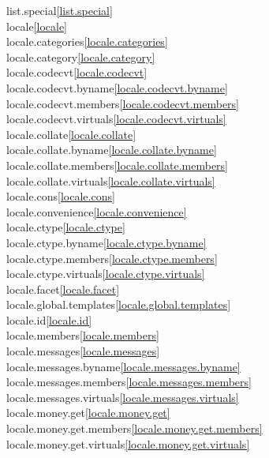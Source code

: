\begin{multicols}{2}
list.special\quad\ref{list.special}\\
locale\quad\ref{locale}\\
locale.categories\quad\ref{locale.categories}\\
locale.category\quad\ref{locale.category}\\
locale.codecvt\quad\ref{locale.codecvt}\\
locale.codecvt.byname\quad\ref{locale.codecvt.byname}\\
locale.codecvt.members\quad\ref{locale.codecvt.members}\\
locale.codecvt.virtuals\quad\ref{locale.codecvt.virtuals}\\
locale.collate\quad\ref{locale.collate}\\
locale.collate.byname\quad\ref{locale.collate.byname}\\
locale.collate.members\quad\ref{locale.collate.members}\\
locale.collate.virtuals\quad\ref{locale.collate.virtuals}\\
locale.cons\quad\ref{locale.cons}\\
locale.convenience\quad\ref{locale.convenience}\\
locale.ctype\quad\ref{locale.ctype}\\
locale.ctype.byname\quad\ref{locale.ctype.byname}\\
locale.ctype.members\quad\ref{locale.ctype.members}\\
locale.ctype.virtuals\quad\ref{locale.ctype.virtuals}\\
locale.facet\quad\ref{locale.facet}\\
locale.global.templates\quad\ref{locale.global.templates}\\
locale.id\quad\ref{locale.id}\\
locale.members\quad\ref{locale.members}\\
locale.messages\quad\ref{locale.messages}\\
locale.messages.byname\quad\ref{locale.messages.byname}\\
locale.messages.members\quad\ref{locale.messages.members}\\
locale.messages.virtuals\quad\ref{locale.messages.virtuals}\\
locale.money.get\quad\ref{locale.money.get}\\
locale.money.get.members\quad\ref{locale.money.get.members}\\
locale.money.get.virtuals\quad\ref{locale.money.get.virtuals}\\

\end{multicols}
